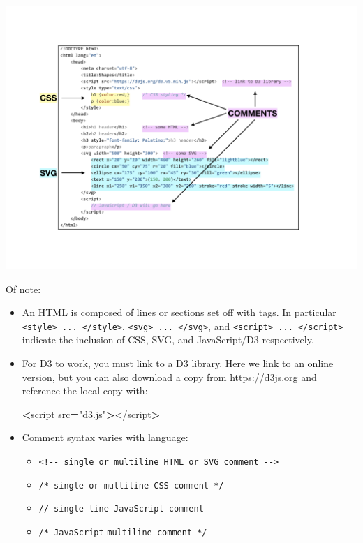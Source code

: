 \documentclass[]{book}
\newenvironment{Shaded}{\begin{snugshade}}{\end{snugshade}}
\newcommand{\NormalTok}[1]{#1}
\newcommand{\OperatorTok}[1]{\textcolor[rgb]{0.81,0.36,0.00}{\textbf{#1}}}
\newcommand{\StringTok}[1]{\textcolor[rgb]{0.31,0.60,0.02}{#1}}
\begin{document}
\begin{center}\includegraphics[width=0.8\linewidth]{images/shapes} \end{center}

Of note:

\begin{itemize}
\item
  An HTML is composed of lines or sections set off with tags. In particular \texttt{\textless{}style\textgreater{}\ ...\ \textless{}/style\textgreater{}}, \texttt{\textless{}svg\textgreater{}\ ...\ \textless{}/svg\textgreater{}}, and \texttt{\textless{}script\textgreater{}\ ...\ \textless{}/script\textgreater{}} indicate the inclusion of CSS, SVG, and JavaScript/D3 respectively.
\item
  For D3 to work, you must link to a D3 library. Here we link to an online version, but you can also download a copy from \url{https://d3js.org} and reference the local copy with:

\begin{Shaded}
\begin{Highlighting}[]
\OperatorTok{<}\NormalTok{script src}\OperatorTok{=}\StringTok{"d3.js"}\OperatorTok{>}\NormalTok{</script}\OperatorTok{>}
\end{Highlighting}
\end{Shaded}
\item
  Comment syntax varies with language:

  \begin{itemize}
  \item
    \texttt{\textless{}!-\/-\ single\ or\ multiline\ HTML\ or\ SVG\ comment\ -\/-\textgreater{}}
  \item
    \texttt{/*\ single\ or\ multiline\ CSS\ comment\ */}
  \item
    \texttt{//\ single\ line\ JavaScript\ comment}
  \item
    \texttt{/*\ JavaScript} \texttt{multiline\ comment\ */}
  \end{itemize}
\end{itemize}
\end{document}

